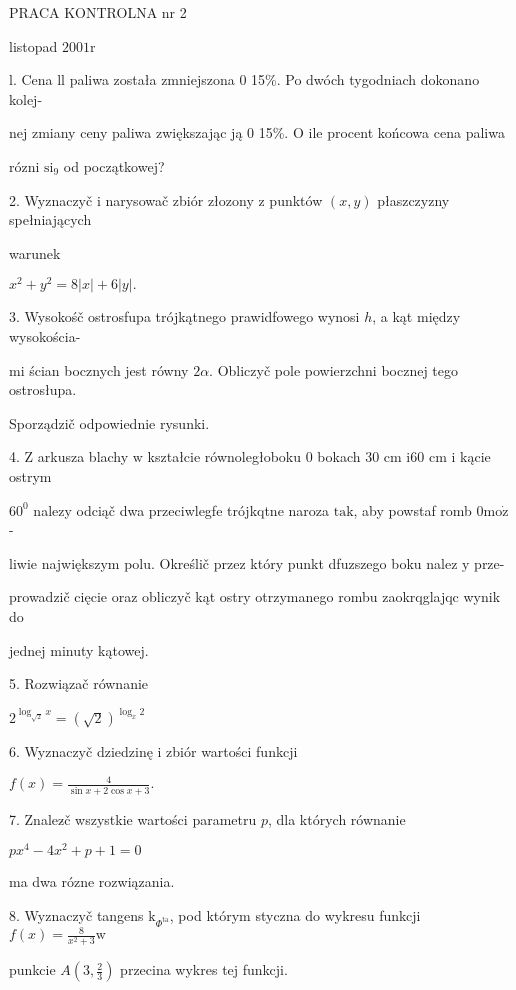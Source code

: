 \documentclass[a4paper,12pt]{article}
\begin{document}
PRACA KONTROLNA nr 2

listopad $2001\mathrm{r}$

l. Cena ll paliwa została zmniejszona $0$ 15\%. Po dwóch tygodniach dokonano kolej-

nej zmiany ceny paliwa zwiększając ją $0$ 15\%. $\mathrm{O}$ ile procent końcowa cena paliwa

rózni $\mathrm{s}\mathrm{i}_{9}$ od początkowej?

2. Wyznaczyč $\mathrm{i}$ narysowač zbiór złozony $\mathrm{z}$ punktów $(x,y)$ płaszczyzny spełniających

warunek

$x^{2}+y^{2}=8|x|+6|y|.$

3. Wysokośč ostrosfupa trójkątnego prawidfowego wynosi $h$, a kąt między wysokościa-

mi ścian bocznych jest równy $ 2\alpha$. Obliczyč pole powierzchni bocznej tego ostrosłupa.

Sporządzič odpowiednie rysunki.

4. $\mathrm{Z}$ arkusza blachy $\mathrm{w}$ kształcie równoległoboku $0$ bokach 30 cm $\mathrm{i}60$ cm $\mathrm{i}$ kącie ostrym

$60^{0}$ nalezy odciąč dwa przeciwlegfe trójkqtne naroza $\mathrm{t}\mathrm{a}\mathrm{k}$, aby powstaf romb $0\mathrm{m}\mathrm{o}\dot{\mathrm{z}}$-

liwie największym polu. Określič przez który punkt dfuzszego boku nalez $\mathrm{y}$ prze-

prowadzič cięcie oraz obliczyč kąt ostry otrzymanego rombu zaokrqglajqc wynik do

jednej minuty kątowej.

5. Rozwiązač równanie

$2^{\log_{\sqrt{2}}x}=(\sqrt{2})^{\log_{x}2}$

6. Wyznaczyč dziedzinę i zbiór wartości funkcji

$f(x)=\displaystyle \frac{4}{\sin x+2\cos x+3}.$

7. Znalez$\acute{}$č wszystkie wartości parametru $p$, dla których równanie

$px^{4}-4x^{2}+p+1=0$

ma dwa rózne rozwiązania.

8. Wyznaczyč tangens $\mathrm{k}_{\Phi^{\mathrm{t}\mathrm{a}}}$, pod którym styczna do wykresu funkcji $f(x) = \displaystyle \frac{8}{x^{2}+3} \mathrm{w}$

punkcie $A(3,\displaystyle \frac{2}{3})$ przecina wykres tej funkcji.
\end{document}

